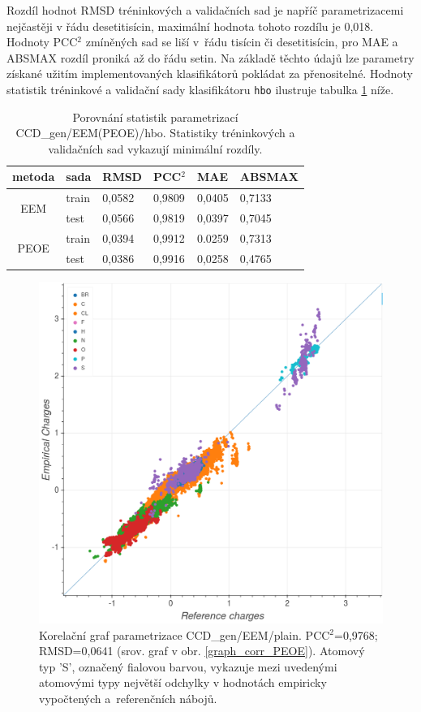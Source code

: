 Rozdíl hodnot RMSD tréninkových a validačních sad je napříč parametrizacemi nejčastěji v řádu desetitisícin, maximální hodnota tohoto rozdílu je 0,018. Hodnoty PCC$^2$ zmíněných sad se liší v~řádu tisícin či desetitisícin, pro MAE a ABSMAX rozdíl proniká až do řádu setin. Na základě těchto údajů lze  parametry získané užitím implementovaných klasifikátorů pokládat za přenositelné. Hodnoty statistik tréninkové a validační sady klasifikátoru \verb|hbo| ilustruje tabulka \ref{prenositelnost} níže.

\begin{table}[h]
    \renewcommand{\arraystretch}{1.4}
    \centering
    \begin{tabular}{c|l|l|l|l|l}
         \textbf{metoda} & \textbf{sada} & \textbf{RMSD} & \textbf{PCC$^2$} & \textbf{MAE} & \textbf{ABSMAX}\\
         \hline
         \multirow{2}{4em}{EEM} & train & 0,0582 & 0,9809 & 0,0405 & 0,7133  \\
         & test & 0,0566 & 0,9819 & 0,0397 & 0,7045 \\
         \hline
         \multirow{2}{4em}{PEOE} & train & 0,0394 & 0,9912 & 0.0259 & 0,7313  \\
         & test & 0,0386  & 0,9916 & 0,0258 & 0,4765 \\
    \end{tabular}
    \caption{Porovnání statistik parametrizací CCD\_gen/EEM(PEOE)/hbo. Statistiky tréninkových a validačních sad vykazují minimální rozdíly.}
    \label{prenositelnost}
\end{table}

\begin{figure}[H]
\begin{center}
\includegraphics[width=12cm]{pictures/plain_EEM_correlation.png}
\caption{Korelační graf parametrizace CCD\_gen/EEM/plain.  PCC$^2$=0,9768; RMSD=0,0641 (srov. graf v obr. \ref{graph_corr_PEOE}). Atomový typ 'S', označený fialovou barvou, vykazuje mezi uvedenými atomovými typy největší odchylky v hodnotách empiricky vypočtených a~referenčních nábojů.}
\label{graph_corr_EEM}
\end{center}
\end{figure}
\newpage

